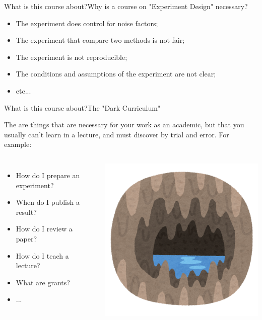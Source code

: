 \documentclass{beamer}
\begin{document}
\begin{CJK}{UTF8}{ipxm}
\begin{frame}{What is this course about?}{Why is a course on "Experiment Design" necessary?}
  \begin{itemize}
    \item The experiment does control for noise factors;\\
    \item The experiment that compare two methods is not fair;\\
    \item The experiment is not reproducible;\\
    \item The conditions and assumptions of the experiment are not clear;\\
    \item etc...
  \end{itemize}
\end{frame}

\begin{frame}{What is this course about?}{The "Dark Curriculum"}

  The  are things that are necessary for your work as an academic, but that you usually can't learn in a lecture, and must discover by \alert{trial and error}. For example:\bigskip

  \begin{columns}
    \begin{itemize}
      \item How do I prepare an experiment?
      \item When do I publish a result?
      \item How do I review a paper?
      \item How do I teach a lecture?
      \item What are grants?
      \item ...
    \end{itemize}
    \includegraphics[width=.7\textwidth]{../img/irasutoya_cave}
  \end{columns}
  \bigskip


\end{frame}
\end{CJK}
\end{document}
